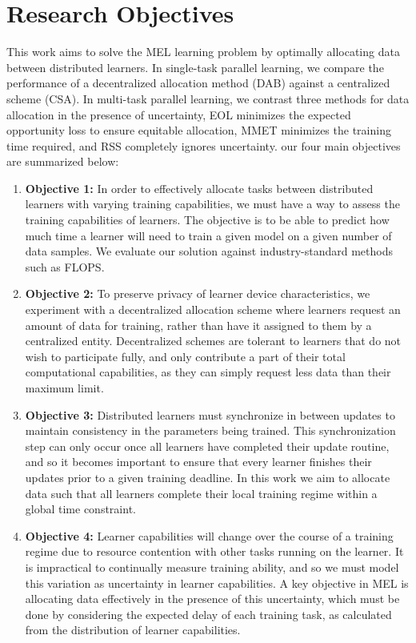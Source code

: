 \documentclass{article}
\begin{document}
\section{Research Objectives}

This work aims to solve the MEL learning problem by optimally allocating data between distributed learners. In single-task parallel learning, we compare the performance of a decentralized allocation method (DAB) against a centralized scheme (CSA). In multi-task parallel learning, we contrast three methods for data allocation in the presence of uncertainty, EOL minimizes the expected opportunity loss to ensure equitable allocation, MMET minimizes the training time required, and RSS completely ignores uncertainty. our four main objectives are summarized below:

\begin{enumerate}
  \item \textbf{Objective 1:} In order to effectively allocate tasks between distributed learners with varying training capabilities, we must have a way to assess the training capabilities of learners. The objective is to be able to predict how much time a learner will need to train a given model on a given number of data samples. We evaluate our solution against industry-standard methods such as FLOPS.

  \item \textbf{Objective 2:} To preserve privacy of learner device characteristics, we experiment with a decentralized allocation scheme where learners request an amount of data for training, rather than have it assigned to them by a centralized entity. Decentralized schemes are tolerant to learners that do not wish to participate fully, and only contribute a part of their total computational capabilities, as they can simply request less data than their maximum limit.

  \item \textbf{Objective 3:} Distributed learners must synchronize in between updates to maintain consistency in the parameters being trained. This synchronization step can only occur once all learners have completed their update routine, and so it becomes important to ensure that every learner finishes their updates prior to a given training deadline. In this work we aim to allocate data such that all learners complete their local training regime within a global time constraint.

  \item \textbf{Objective 4:} Learner capabilities will change over the course of a training regime due to resource contention with other tasks running on the learner. It is impractical to continually measure training ability, and so we must model this variation as uncertainty in learner capabilities. A key objective in MEL is allocating data effectively in the presence of this uncertainty, which must be done by considering the expected delay of each training task, as calculated from the distribution of learner capabilities.

\end{enumerate}
\end{document}
